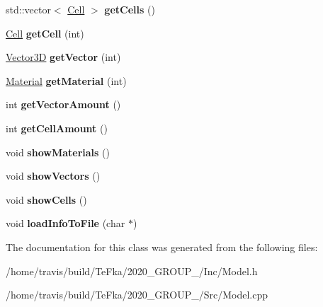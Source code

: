 \begin{DoxyCompactItemize}
\item 
std\+::vector$<$ \hyperlink{class_cell}{Cell} $>$ {\bfseries get\+Cells} ()\hypertarget{class_model_af1b55cd1a07b6ecf6858c78ebc3d56d0}{}\label{class_model_af1b55cd1a07b6ecf6858c78ebc3d56d0}

\item 
\hyperlink{class_cell}{Cell} {\bfseries get\+Cell} (int)\hypertarget{class_model_a4a57497301bb2ab1d8dee7dfc1b7a240}{}\label{class_model_a4a57497301bb2ab1d8dee7dfc1b7a240}

\item 
\hyperlink{class_vector3_d}{Vector3D} {\bfseries get\+Vector} (int)\hypertarget{class_model_a6d877aa2a535c2a613fd92d6ef80b576}{}\label{class_model_a6d877aa2a535c2a613fd92d6ef80b576}

\item 
\hyperlink{class_material}{Material} {\bfseries get\+Material} (int)\hypertarget{class_model_a9dfba34e1752702d74e8c77e3f591b3f}{}\label{class_model_a9dfba34e1752702d74e8c77e3f591b3f}

\item 
int {\bfseries get\+Vector\+Amount} ()\hypertarget{class_model_acd0f324509ae2321c04f259fd0133a7a}{}\label{class_model_acd0f324509ae2321c04f259fd0133a7a}

\item 
int {\bfseries get\+Cell\+Amount} ()\hypertarget{class_model_a29b97b575c9ebfa2aaa9806cfa094f1e}{}\label{class_model_a29b97b575c9ebfa2aaa9806cfa094f1e}

\item 
void {\bfseries show\+Materials} ()\hypertarget{class_model_ae7b7dfcec56ec095782b672745f64c7e}{}\label{class_model_ae7b7dfcec56ec095782b672745f64c7e}

\item 
void {\bfseries show\+Vectors} ()\hypertarget{class_model_ac6201ae8b810e878da7c0af337cc6e84}{}\label{class_model_ac6201ae8b810e878da7c0af337cc6e84}

\item 
void {\bfseries show\+Cells} ()\hypertarget{class_model_adb18726e9aee1ec6f0980f5e4624e481}{}\label{class_model_adb18726e9aee1ec6f0980f5e4624e481}

\item 
void {\bfseries load\+Info\+To\+File} (char $\ast$)\hypertarget{class_model_a6f31f2c1849ca236b837521a5303f320}{}\label{class_model_a6f31f2c1849ca236b837521a5303f320}

\end{DoxyCompactItemize}


The documentation for this class was generated from the following files\+:\begin{DoxyCompactItemize}
\item 
/home/travis/build/\+Te\+Fka/2020\+\_\+\+G\+R\+O\+U\+P\+\_/\+Inc/Model.\+h\item 
/home/travis/build/\+Te\+Fka/2020\+\_\+\+G\+R\+O\+U\+P\+\_/\+Src/Model.\+cpp\end{DoxyCompactItemize}
